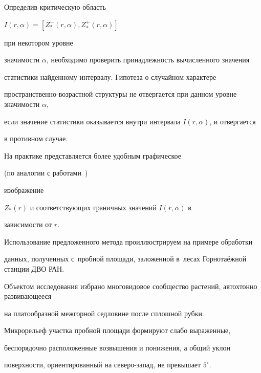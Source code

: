 
Определив критическую область  

$I(r,\alpha)=[Z_{\ast}^{-}(r,\alpha),Z_{\ast}^{+}(r,\alpha)]$ 

при некотором уровне 

значимости $\alpha$, необходимо проверить принадлежность вычисленного значения 

статистики найденному интервалу. Гипотеза о случайном характере 

про\-стран\-ствен\-но-воз\-раст\-ной структуры не отвергается при данном уровне значимости $\alpha$, 

если значение статистики оказывается внутри интервала $I(r,\alpha)$, и отвергается 

в противном случае. 

На практике представляется более удобным  графическое 

(по аналогии с работами~\cite{kislovbr:bib:ripley3, kislovbr:bib:newripley3}) 

изображение 

$Z_{\ast}(r)$ и соответствующих граничных значений $I(r,\alpha)$ в 

зависимости от $r$. 








\smallskip


Использование предложенного метода проиллюстрируем на примере обработки

данных, полученных с~пробной площади, заложенной в~лесах  Горнотаёжной станции ДВО РАН. 

Объектом исследования  избрано многовидовое сообщество растений, автохтонно развивающееся 

на платообразной межгорной седловине после сплошной рубки. 

Микрорельеф участка пробной площади формируют слабо выраженные, 

беспорядочно расположенные возвышения и понижения, а общий уклон 

поверхности, ориентированный на северо-запад, не превышает $5^{\circ}$. 



